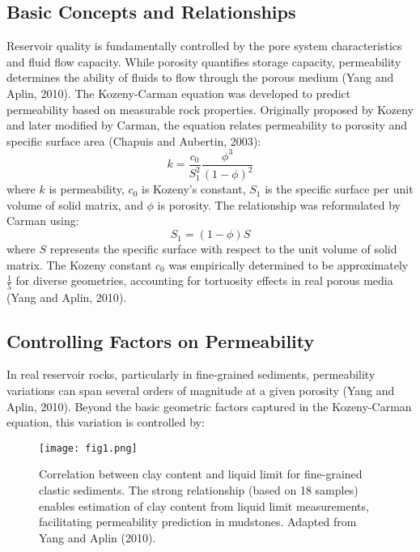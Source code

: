 \documentclass[journal]{IEEEtran}
\begin{document}
\subsection{Basic Concepts and Relationships}
Reservoir quality is fundamentally controlled by the pore system characteristics and fluid flow capacity. While porosity quantifies storage capacity, permeability determines the ability of fluids to flow through the porous medium (Yang and Aplin, 2010\parencite{yang_permeabilityporosity_2010}).
The Kozeny-Carman equation was developed to predict permeability based on measurable rock properties. Originally proposed by Kozeny and later modified by Carman, the equation relates permeability to porosity and specific surface area (Chapuis and Aubertin, 2003\parencite{chapuis_use_2003}):
\begin{equation}
k = \frac{c_0}{S_1^2}\frac{\phi^3}{(1-\phi)^2}
\end{equation}
\noindent where $k$ is permeability, $c_0$ is Kozeny's constant, $S_1$ is the specific surface per unit volume of solid matrix, and $\phi$ is porosity. The relationship was reformulated by Carman using:
\begin{equation}
S_1 = (1-\phi)S
\end{equation}
\noindent where $S$ represents the specific surface with respect to the unit volume of solid matrix. The Kozeny constant $c_0$ was empirically determined to be approximately $\frac{1}{5}$ for diverse geometries, accounting for tortuosity effects in real porous media (Yang and Aplin, 2010\parencite{yang_permeabilityporosity_2010}).

\subsection{Controlling Factors on Permeability}

In real reservoir rocks, particularly in fine-grained sediments, permeability variations can span several orders of magnitude at a given porosity (Yang and Aplin, 2010\parencite{yang_permeabilityporosity_2010}). Beyond the basic geometric factors captured in the Kozeny-Carman equation, this variation is controlled by:

\begin{figure}[t]
    \centering
    \texttt{[image: fig1.png]}
    \caption{Correlation between clay content and liquid limit for fine-grained clastic sediments. The strong relationship (based on 18 samples) enables estimation of clay content from liquid limit measurements, facilitating permeability prediction in mudstones. Adapted from Yang and Aplin (2010).}
    \label{fig:clay_liquid}
\end{figure}
\end{document}
